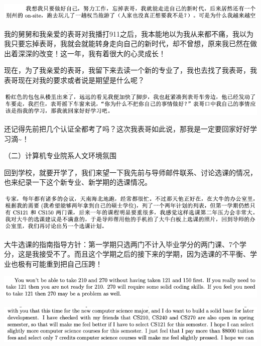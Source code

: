 \documentclass[9pt, b5paper]{article}
\begin{document}
\begin{center}
\includegraphics[width=.9\linewidth]{./pic/backups_plans_20210424_090155.png}
\end{center}

我的舅舅和我亲爱的表哥对我播打911之后，我本能地以为我从来都不痛，我以为我只要忘掉表哥，我就会就能转身走向自己的新时代，却不曾想，原来我已然在做出着深深的改变！这一年，我有着很大的心灵成长！

现在，为了我亲爱的表哥，我留下来去读一个新的专业了，我也去找了我表哥，我表哥现在对我的要求或者说是期望是什么呢？

\begin{center}
\includegraphics[width=.9\linewidth]{./pic/backups_plans_20210424_092138.png}
\end{center}

还记得先前把几个认证全都考了吗？这次我表哥如此说，那我是一定要回家好好学习滴\textasciitilde{}！

（二）计算机专业院系人文环境氛围

回到学校，就要开学了，我们来望一下我先前与导师邮件联系、讨论选课的情况，也来纪录一下这个新专业、新学期的选课情况。

\begin{center}
\includegraphics[width=.9\linewidth]{./pic/backups_plans_20210424_113709.png}
\end{center}

大牛选课的指南指导方针：第一学期只选两门不计入毕业学分的两门课、7个学分，这是我接受不了。而且这个学期之后的接下来的学期，因为选课的不平衡、学业也极有可能重到把自己压跨！

\begin{center}
\includegraphics[width=.9\linewidth]{./pic/backups_plans_20210424_114045.png}
\end{center}

\begin{center}
\includegraphics[width=.9\linewidth]{./pic/backups_plans_20210424_114115.png}
\end{center}
\end{document}
